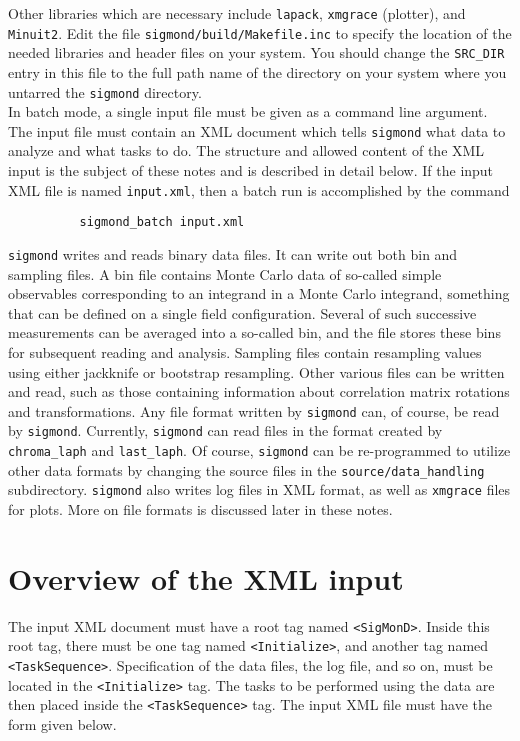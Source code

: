 \documentclass[12pt]{article}
\newcommand{\sigmond}{\texttt{sigmond} }
\newcommand{\vb}{\texttt}
\begin{document}
Other libraries which are necessary include \vb{lapack}, \vb{xmgrace} (plotter), 
and \vb{Minuit2}.
Edit the file
\vb{sigmond/build/Makefile.inc} to specify the location of the needed
libraries and header files on your system.  You should change the \vb{SRC\_DIR}
entry in this file to the full path name of the directory on your system
where you untarred the \vb{sigmond} directory.\\

In batch mode, a single input file must be given as a command line
argument.  The input file must contain an XML document which
tells \sigmond what data to analyze and what tasks to do.  The structure
and allowed content of the XML input is the subject of these notes and
is described in detail below.  If the input XML file is named
\vb{input.xml}, then a batch run is accomplished by the command
\begin{verbatim}
          sigmond_batch input.xml
\end{verbatim}


\vb{sigmond} writes and reads binary data files.  It can write out
both bin and sampling files.  A bin file contains Monte Carlo data
of so-called simple observables corresponding to an integrand in a Monte
Carlo integrand, something that can be defined on a single field
configuration.  Several of such successive measurements can be averaged
into a so-called bin, and the file stores these bins for subsequent
reading and analysis.  Sampling files contain resampling values using
either jackknife or bootstrap resampling.  Other various files can
be written and read, such as those containing information about
correlation matrix rotations and transformations.  Any file format
written by \vb{sigmond} can, of course, be read by \vb{sigmond}.
Currently, \vb{sigmond} can read files in the format created by
\vb{chroma\_laph} and \vb{last\_laph}.  Of course, \vb{sigmond} can be 
re-programmed to utilize other data formats by changing the source files 
in the \vb{source/data\_handling} subdirectory. \vb{sigmond} also writes 
log files in XML format, as well as \vb{xmgrace} files for plots.
More on file formats is discussed later in these notes.

\section{Overview of the XML input}
The input XML document must have a root tag named \vb{<SigMonD>}. 
Inside this root tag, there must be one tag named \vb{<Initialize>},
and another tag named \vb{<TaskSequence>}.  Specification of the data
files, the log file, and so on, must be located in the \vb{<Initialize>}
tag.  The tasks to be performed using the data are then placed inside
the \vb{<TaskSequence>} tag.   The input XML file must have the form
given below.    
\end{document}
